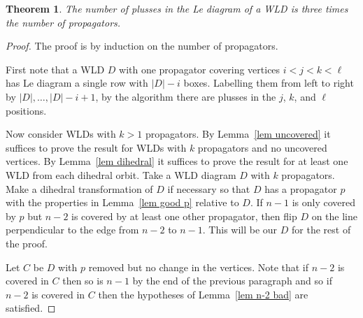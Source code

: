 \documentclass[11pt]{article}
\newtheorem{thm}{Theorem}[section]
\theoremstyle{remark}
\theoremstyle{definition}
\begin{document}
\begin{thm}
  The number of plusses in the Le diagram of a WLD is three times the number of propagators.
\end{thm}

\begin{proof}
  The proof is by induction on the number of propagators.

  First note that a WLD $D$ with one propagator covering vertices $i<j<k<\ell$ has Le diagram a single row with $|D|-i$ boxes.  Labelling them from left to right by $|D|, \ldots, |D|-i+1$, by the algorithm there are plusses in the $j$, $k$, and $\ell$ positions.

  Now consider WLDs with $k>1$ propagators.  By Lemma~\ref{lem uncovered} it suffices to prove the result for WLDs with $k$ propagators and no uncovered vertices.  By Lemma~\ref{lem dihedral} it suffices to prove the result for at least one WLD from each dihedral orbit.  Take a WLD diagram $D$ with $k$ propagators.  Make a dihedral transformation of $D$ if necessary so that $D$ has a propagator $p$ with the properties in Lemma~\ref{lem good p} relative to $D$.  If $n-1$ is only covered by $p$ but $n-2$ is covered by at least one other propagator, then flip $D$ on the line perpendicular to the edge from $n-2$ to $n-1$.  This will be our $D$ for the rest of the proof.

  Let $C$ be $D$ with $p$ removed but no change in the vertices.  Note that if $n-2$ is covered in $C$ then so is $n-1$ by the end of the previous paragraph and so if $n-2$ is covered in $C$ then the hypotheses of Lemma~\ref{lem n-2 bad} are satisfied.


\end{proof}
\end{document}
